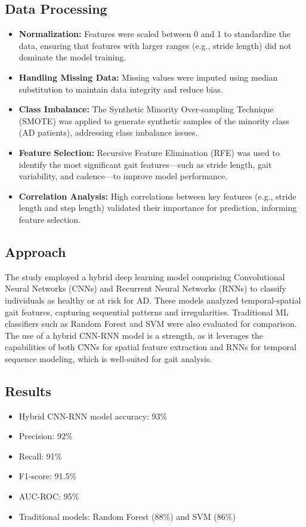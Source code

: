 \subsection*{Data Processing}
\begin{itemize}
    \item \textbf{Normalization:} Features were scaled between 0 and 1 to standardize the data, ensuring that features with larger ranges (e.g., stride length) did not dominate the model training.
    \item \textbf{Handling Missing Data:} Missing values were imputed using median substitution to maintain data integrity and reduce bias.
    \item \textbf{Class Imbalance:} The Synthetic Minority Over-sampling Technique (SMOTE) was applied to generate synthetic samples of the minority class (AD patients), addressing class imbalance issues.
    \item \textbf{Feature Selection:} Recursive Feature Elimination (RFE) was used to identify the most significant gait features—such as stride length, gait variability, and cadence—to improve model performance.
    \item \textbf{Correlation Analysis:} High correlations between key features (e.g., stride length and step length) validated their importance for prediction, informing feature selection.
\end{itemize}

\subsection*{Approach}
The study employed a hybrid deep learning model comprising Convolutional Neural Networks (CNNs) and Recurrent Neural Networks (RNNs) to classify individuals as healthy or at risk for AD. These models analyzed temporal-spatial gait features, capturing sequential patterns and irregularities. Traditional ML classifiers such as Random Forest and SVM were also evaluated for comparison. The use of a hybrid CNN-RNN model is a strength, as it leverages the capabilities of both CNNs for spatial feature extraction and RNNs for temporal sequence modeling, which is well-suited for gait analysis.

\subsection*{Results}
\begin{itemize}
    \item Hybrid CNN-RNN model accuracy: 93\%
    \item Precision: 92\% 
    \item Recall: 91\%
    \item F1-score: 91.5\%
    \item AUC-ROC: 95\%
    \item Traditional models: Random Forest (88\%) and SVM (86\%)
\end{itemize}

